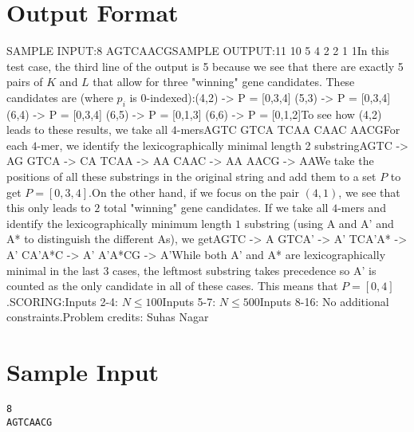 \documentclass[12pt]{article}
\begin{document}
\section*{Output Format}
SAMPLE INPUT:8
AGTCAACGSAMPLE OUTPUT:11
10
5
4
2
2
1
1In this test case, the third line of the output is 5 because we see that there are exactly 5 pairs of $K$ and $L$ that allow for
three "winning" gene candidates.  These candidates are (where $p_i$ is $0$-indexed):(4,2) -> P = [0,3,4]
(5,3) -> P = [0,3,4]
(6,4) -> P = [0,3,4]
(6,5) -> P = [0,1,3]
(6,6) -> P = [0,1,2]To see how (4,2) leads to these results, we take all $4$-mersAGTC
GTCA
TCAA
CAAC
AACGFor each $4$-mer, we identify the lexicographically minimal length 2 substringAGTC -> AG
GTCA -> CA
TCAA -> AA
CAAC -> AA
AACG -> AAWe take the positions of all these substrings in the original string and add
them to a set $P$ to get $P = [0,3,4]$.On the other hand, if we focus on the pair $(4,1)$, we see that this only leads
to $2$ total "winning" gene candidates. If we take all $4$-mers and identify the
lexicographically minimum length $1$ substring (using A and A' and A* to
distinguish the different As), we getAGTC -> A
GTCA' -> A'
TCA'A* -> A'
CA'A*C -> A'
A'A*CG -> A'While both A' and A* are lexicographically minimal in the last 3 cases, the
leftmost substring takes precedence so A' is counted as the only candidate in
all of these cases. This means that $P = [0,4]$.SCORING:Inputs 2-4: $N \leq 100$Inputs 5-7: $N \leq 500$Inputs 8-16: No additional constraints.Problem credits: Suhas Nagar

\section*{Sample Input}
\begin{verbatim}
8
AGTCAACG
\end{verbatim}
\end{document}
